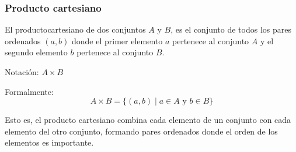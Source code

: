 \subsubsection{Producto cartesiano}
\vspace{1em}
\begin{fmd-definition}
	El \gls{productocartesiano} de dos conjuntos \(A\) y \(B\), es el conjunto de todos los pares ordenados \((a, b)\) donde el primer elemento \(a\) pertenece al conjunto \(A\) y el segundo elemento \(b\) pertenece al conjunto \(B\).

	Notación: \(A \times B\)
	
	Formalmente:
	$$A \times B = \{(a, b) \mid a \in A \text{ y } b \in B\}$$
	
	Esto es, el producto cartesiano combina cada elemento de un conjunto con cada elemento del otro conjunto, formando pares ordenados donde el orden de los elementos es importante.
\end{fmd-definition}

